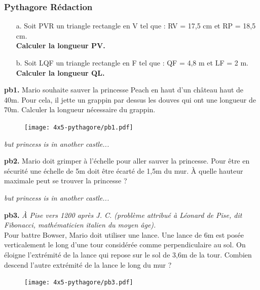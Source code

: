 \subsubsection*{Pythagore Rédaction}

\begin{multicols}{2}
\begin{enumerate}
  \item[a.]Soit PVR un triangle rectangle en V tel que : RV = 17,5 cm et RP = 18,5 cm. \\
  \textbf{Calculer la longueur PV.}

  \item[b.]Soit LQF un triangle rectangle en F tel que : QF = 4,8 m et LF = 2 m. \\
  \textbf{Calculer la longueur QL.}

\end{enumerate}
\end{multicols}

\Pointilles[9]

\begin{minipage}[t]{0.65\textwidth}
  \textbf{pb1.} Mario souhaite sauver la princesse Peach en haut d'un château haut de 40m. Pour cela, il jette un grappin par dessus les douves qui ont une longueur de 70m. Calculer la longueur nécessaire du grappin.
  
  \Pointilles[5]
  \end{minipage}
  \begin{minipage}[t]{0.35\textwidth}
  \begin{figure}[H]
    \centering
    \texttt{[image: 4x5-pythagore/pb1.pdf]}
  \end{figure}
\end{minipage}

\newpage

\textit{but princess is in another castle...}

\textbf{pb2.} Mario doit grimper à l'échelle pour aller sauver la princesse. Pour être en sécurité une échelle de 5m doit être écarté de 1,5m du mur. À quelle hauteur maximale peut se trouver la princesse ? \\
\Pointilles[5]

\begin{minipage}[t]{0.65\textwidth}
  \textit{but princess is in another castle...}

  \textbf{pb3.}  \textit{À Pise vers 1200 après J. C. (problème attribué à Léonard de Pise, dit Fibonacci, mathématicien italien   du moyen âge).} \\
  Pour battre Bowser, Mario doit utiliser une lance. Une lance de 6m est posée verticalement le long d’une tour considérée comme perpendiculaire au sol. On éloigne l’extrémité de la lance qui repose sur le sol de 3,6m de la tour. Combien descend l’autre extrémité de la lance le long du mur ?
  \Pointilles[6]
  \end{minipage}
  \begin{minipage}[t]{0.35\textwidth}
  \begin{figure}[H]
    \centering
    \texttt{[image: 4x5-pythagore/pb3.pdf]}
  \end{figure}
\end{minipage}

